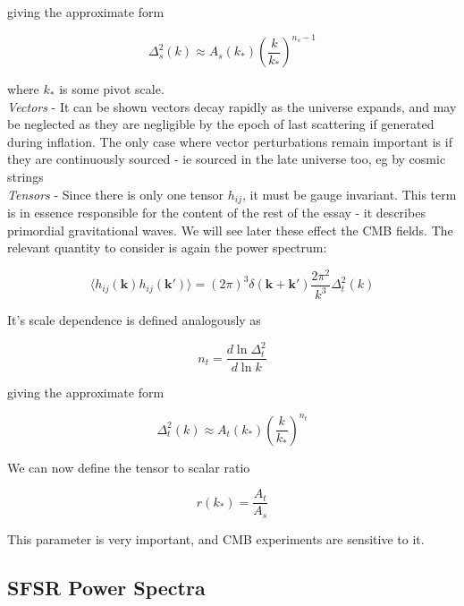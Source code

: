 \documentclass[a4paper,10pt]{article}
\renewcommand{\v}[1]{\mathbf{#1}}
\begin{document}
giving the approximate form 

\begin{equation}
\Delta^2_s(k) \approx A_s(k_*)(\frac{k}{k_*})^{n_s-1} 
\end{equation}

where $k_*$ is some pivot scale. \\



\textit{Vectors} - It can be shown vectors decay rapidly as the universe expands, and may be neglected as they are negligible by the epoch of last scattering if generated during inflation. The only case where vector perturbations remain important is if they are continuously sourced - ie sourced in the late universe too, eg by cosmic strings\\

\textit{Tensors} - Since there is only one tensor $h_{ij}$, it must be gauge invariant. This term is in essence responsible for the content of the rest of the essay - it describes primordial gravitational waves. We will see later these effect the CMB fields. The relevant quantity to consider is again the power spectrum:

\begin{equation}
\langle h_{ij}(\v{k})h_{ij}(\v{k'}) \rangle=(2\pi)^3\delta(\v{k}+\v{k'})\frac{2\pi^2}{k^3}\Delta^2_t(k)
\end{equation}

It's scale dependence is defined analogously as 

\begin{equation}
n_t = \frac{d\ln{\Delta^2_t}}{d\ln{k}}
\end{equation}

giving the approximate form 

\begin{equation}
\Delta^2_t(k) \approx A_t(k_*)(\frac{k}{k_*})^{n_t}
\end{equation}

We can now define the tensor to scalar ratio

\begin{equation}
r(k_*)=\frac{A_t}{A_s} 
\end{equation}

This parameter is very important, and CMB experiments are sensitive to it. \\

\subsection{SFSR Power Spectra}
\end{document}
